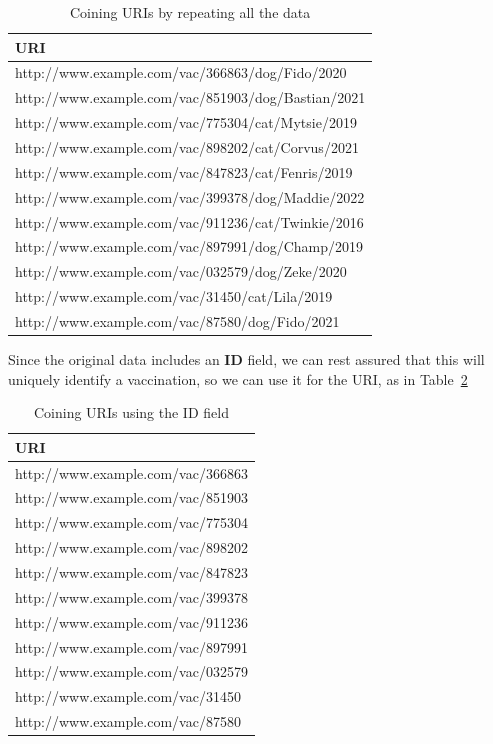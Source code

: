 \begin{table}
    \centering
    \begin{tabular}{|l|}
    \hline
    URI \\
    \hline\hline
http://www.example.com/vac/366863/dog/Fido/2020 \\
http://www.example.com/vac/851903/dog/Bastian/2021 \\
http://www.example.com/vac/775304/cat/Mytsie/2019 \\
http://www.example.com/vac/898202/cat/Corvus/2021 \\
http://www.example.com/vac/847823/cat/Fenris/2019 \\
http://www.example.com/vac/399378/dog/Maddie/2022 \\
http://www.example.com/vac/911236/cat/Twinkie/2016 \\
http://www.example.com/vac/897991/dog/Champ/2019 \\
http://www.example.com/vac/032579/dog/Zeke/2020 \\
http://www.example.com/vac/31450/cat/Lila/2019 \\
http://www.example.com/vac/87580/dog/Fido/2021 \\
\hline
    \end{tabular}
    \caption{Coining URIs by repeating all the data }
    \label{tab:ch5.all}
\end{table}

Since the original data includes an \textbf{ID} field, we can rest assured that this 
will uniquely identify a vaccination, so we can use it for the URI, as in Table~\ref{tab:ch5.id}

\begin{table}
    \centering
    \begin{tabular}{|l |}
    \hline
    URI \\
    \hline\hline
http://www.example.com/vac/366863 \\
http://www.example.com/vac/851903 \\
http://www.example.com/vac/775304 \\
http://www.example.com/vac/898202 \\
http://www.example.com/vac/847823 \\
http://www.example.com/vac/399378 \\
http://www.example.com/vac/911236 \\
http://www.example.com/vac/897991 \\
http://www.example.com/vac/032579 \\
http://www.example.com/vac/31450 \\
http://www.example.com/vac/87580 \\
\hline
    \end{tabular}
    \caption{Coining URIs using the ID field }
    \label{tab:ch5.id}
\end{table}


